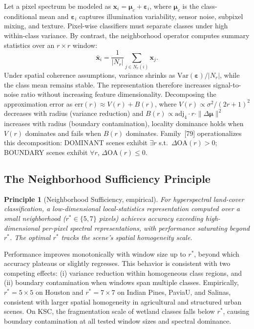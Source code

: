 \documentclass[journal]{IEEEtran}
\newtheorem{principle}{Principle}
\newcommand{\rstar}{r^{*}}
\begin{document}
Let a pixel spectrum be modeled as $\mathbf{x}_i = \boldsymbol{\mu}_c
+ \boldsymbol{\varepsilon}_i$, where $\boldsymbol{\mu}_c$ is the
class-conditional mean and $\boldsymbol{\varepsilon}_i$ captures
illumination variability, sensor noise, subpixel mixing, and texture.
Pixel-wise classifiers must separate classes under high within-class
variance. By contrast, the neighborhood operator computes summary
statistics over an $r{\times}r$ window:
\begin{equation}
  \bar{\mathbf{x}}_i = \frac{1}{|N_r|}
  \sum_{j \in N_r(i)} \mathbf{x}_j.
\end{equation}
Under spatial coherence assumptions, variance shrinks as
$\mathrm{Var}(\boldsymbol{\varepsilon})/|N_r|$, while the class mean
remains stable. The representation therefore increases signal-to-noise
ratio without increasing feature dimensionality.  Decomposing the
approximation error as $\mathrm{err}(r) \approx V(r) + B(r)$, where
$V(r) \propto \sigma^2/(2r{+}1)^2$ decreases with radius (variance
reduction) and $B(r) \propto \mathrm{adj}_4 \cdot r \cdot
\|\Delta\boldsymbol{\mu}\|^2$ increases with radius (boundary
contamination), locality dominance holds when $V(r)$ dominates and
fails when $B(r)$ dominates.  Family~[79] operationalizes this
decomposition: DOMINANT scenes exhibit $\exists r$ s.t.\
$\Delta\mathrm{OA}(r) > 0$; BOUNDARY scenes exhibit $\forall r$,
$\Delta\mathrm{OA}(r) \le 0$.

\subsection{The Neighborhood Sufficiency Principle}

\begin{principle}[Neighborhood Sufficiency, empirical]
For hyperspectral land-cover classification, a low-dimensional
local-statistics representation computed over a small neighborhood
($\rstar \in \{5, 7\}$ pixels) achieves accuracy exceeding
high-dimensional per-pixel spectral representations, with performance
saturating beyond $\rstar$. The optimal $\rstar$ tracks the scene's
spatial homogeneity scale.
\end{principle}

Performance improves monotonically with window size up to $\rstar$,
beyond which accuracy plateaus or slightly regresses. This behavior
is consistent with two competing effects: (i) variance reduction
within homogeneous class regions, and (ii) boundary contamination
when windows span multiple classes. Empirically, $\rstar{=}5{\times}5$
on Houston and $\rstar{=}7{\times}7$ on Indian Pines, PaviaU, and
Salinas, consistent with larger spatial homogeneity in agricultural
and structured urban scenes. On KSC, the fragmentation scale of
wetland classes falls below $\rstar$, causing boundary contamination
at all tested window sizes and spectral dominance.
\end{document}

